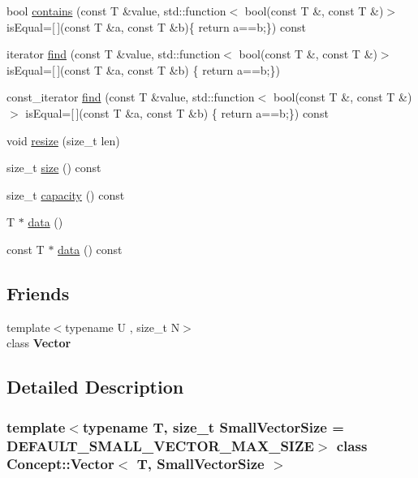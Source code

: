 \begin{DoxyCompactItemize}
\item 
bool \mbox{\hyperlink{class_concept_1_1_vector_a17d62b0ccb0f1cceb78748c44f625269}{contains}} (const T \&value, std\+::function$<$ bool(const T \&, const T \&)$>$ is\+Equal=\mbox{[}$\,$\mbox{]}(const T \&a, const T \&b)\{ return a==b;\}) const
\item 
iterator \mbox{\hyperlink{class_concept_1_1_vector_a5c4b45f64ca14b02d544513c5b8ccbcd}{find}} (const T \&value, std\+::function$<$ bool(const T \&, const T \&)$>$ is\+Equal=\mbox{[}$\,$\mbox{]}(const T \&a, const T \&b) \{ return a==b;\})
\item 
const\+\_\+iterator \mbox{\hyperlink{class_concept_1_1_vector_a8e87660ff45eb3b2112edd8397373d2a}{find}} (const T \&value, std\+::function$<$ bool(const T \&, const T \&)$>$ is\+Equal=\mbox{[}$\,$\mbox{]}(const T \&a, const T \&b) \{ return a==b;\}) const
\item 
void \mbox{\hyperlink{class_concept_1_1_vector_afc564010d47219272ccc41a7536aa13f}{resize}} (size\+\_\+t len)
\item 
size\+\_\+t \mbox{\hyperlink{class_concept_1_1_vector_a8cffe973b29a8139f5b8c65409ad9f95}{size}} () const
\item 
size\+\_\+t \mbox{\hyperlink{class_concept_1_1_vector_a7c6ea6d0b7df98242f2247c8d5184c5f}{capacity}} () const
\item 
T $\ast$ \mbox{\hyperlink{class_concept_1_1_vector_a37d79a7609e4493dd0c10ab5948914ec}{data}} ()
\item 
const T $\ast$ \mbox{\hyperlink{class_concept_1_1_vector_a62b7aace523228b3c8dadf4c898cc01a}{data}} () const
\end{DoxyCompactItemize}
\subsection*{Friends}
\begin{DoxyCompactItemize}
\item 
\mbox{\label{class_concept_1_1_vector_ac14c06b74acbf135ede85924e7b3d521}} 
{\footnotesize template$<$typename U , size\+\_\+t N$>$ }\\class {\bfseries Vector}
\end{DoxyCompactItemize}


\subsection{Detailed Description}
\subsubsection*{template$<$typename T, size\+\_\+t Small\+Vector\+Size = D\+E\+F\+A\+U\+L\+T\+\_\+\+S\+M\+A\+L\+L\+\_\+\+V\+E\+C\+T\+O\+R\+\_\+\+M\+A\+X\+\_\+\+S\+I\+ZE$>$\newline
class Concept\+::\+Vector$<$ T, Small\+Vector\+Size $>$}

